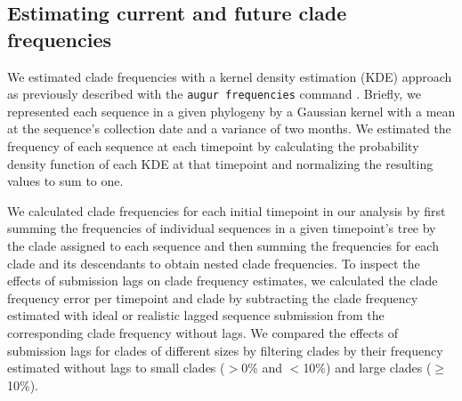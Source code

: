 \documentclass[9pt,lineno]{elife}
\begin{document}
\subsection{Estimating current and future clade frequencies}

We estimated clade frequencies with a kernel density estimation (KDE) approach as previously described \citep{Huddleston2020} with the \texttt{augur frequencies} command \citep{Huddleston2021}.
Briefly, we represented each sequence in a given phylogeny by a Gaussian kernel with a mean at the sequence's collection date and a variance of two months.
We estimated the frequency of each sequence at each timepoint by calculating the probability density function of each KDE at that timepoint and normalizing the resulting values to sum to one.

We calculated clade frequencies for each initial timepoint in our analysis by first summing the frequencies of individual sequences in a given timepoint's tree by the clade assigned to each sequence and then summing the frequencies for each clade and its descendants to obtain nested clade frequencies.
To inspect the effects of submission lags on clade frequency estimates, we calculated the clade frequency error per timepoint and clade by subtracting the clade frequency estimated with ideal or realistic lagged sequence submission from the corresponding clade frequency without lags.
We compared the effects of submission lags for clades of different sizes by filtering clades by their frequency estimated without lags to small clades ($>$0\% and $<$10\%) and large clades ($\ge$10\%).
\end{document}
